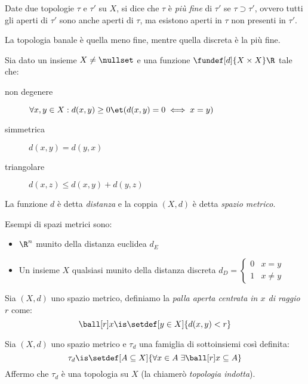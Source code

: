 \begin{defn}[Finezza]
	Date due topologie $\tau$ e $\tau'$ su $X$,
	si dice che $\tau$ è \emph{più fine} di $\tau'$ se $\tau\supset\tau'$,
	ovvero tutti gli aperti di $\tau'$ sono anche aperti di $\tau$,
	ma esistono aperti in $\tau$ non presenti in $\tau'$.
\end{defn}

\begin{oss}
	La topologia banale è quella meno fine, mentre quella discreta è la più fine.
\end{oss}


\begin{defn}
	Sia dato un insieme $X\neq\nullset$ e una funzione $\fundef[d]{X \times X}\R$ tale che:
	\begin{description}
		\item[non degenere] $\forall x,y \in X:  d(x,y)\ge0 \et (d(x,y)=0 \iff x=y)$
		\item[simmetrica] $d(x,y) = d(y,x)$
		\item[triangolare] $d(x,z) \le d(x,y) + d(y,z)$
	\end{description}
	La funzione $d$ è detta \emph{distanza} e la coppia $(X,d)$ è detta \emph{spazio metrico}.
\end{defn}

\begin{es}
	\label{es:spazimetrici}
	Esempi di spazi metrici sono:
	\begin{itemize}
		\item $\R^n$ munito della distanza euclidea $d_E$
		\item Un insieme $X$ qualsiasi munito della distanza discreta
		$d_D= \begin{cases} 0 & x=y \\ 1 & x \neq y \end{cases}$
	\end{itemize}
\end{es}

\begin{defn}
	Sia $(X,d)$ uno spazio metrico,
	definiamo la \emph{palla aperta centrata in $x$ di raggio $r$} come:
	\[\ball[r]x \is \setdef[y \in X]{d(x,y) < r}\]
\end{defn}

\begin{prop}
	Sia $(X, d)$ uno spazio metrico e $\tau_d$ una famiglia di sottoinsiemi così definita:
	\[\tau_d \is \setdef[A \subseteq  X]{\forall x \in A \;\exists \ball[r]x \subseteq A}\]
	Affermo che $\tau_d$ è una topologia su $X$ (la chiamerò \emph{topologia indotta}).
\end{prop}

